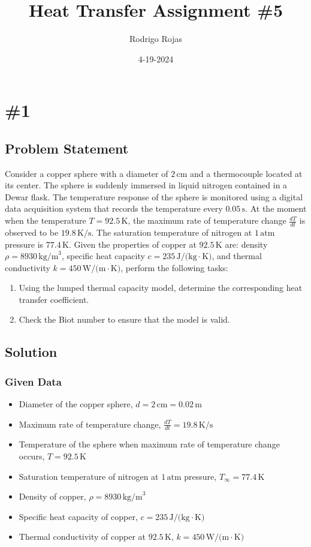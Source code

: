 \documentclass{article}
\title{Heat Transfer Assignment \#5}
\author{Rodrigo Rojas}
\date{4-19-2024}
\numberwithin{equation}{section}
\begin{document}
\maketitle

\section{\#1}
\subsection*{Problem Statement}

Consider a copper sphere with a diameter of $2 \, \text{cm}$ and a thermocouple located at its center. The sphere is suddenly immersed in liquid nitrogen contained in a Dewar flask. The temperature response of the sphere is monitored using a digital data acquisition system that records the temperature every $0.05 \, \text{s}$. At the moment when the temperature $T = 92.5 \, \text{K}$, the maximum rate of temperature change $\frac{dT}{dt}$ is observed to be $19.8 \, \text{K/s}$. The saturation temperature of nitrogen at $1 \, \text{atm}$ pressure is $77.4 \, \text{K}$. Given the properties of copper at $92.5 \, \text{K}$ are: density $\rho = 8930 \, \text{kg/m}^3$, specific heat capacity $c = 235 \, \text{J/(kg}\cdot\text{K)}$, and thermal conductivity $k = 450 \, \text{W/(m}\cdot\text{K)}$, perform the following tasks:

\begin{enumerate}
  \item Using the lumped thermal capacity model, determine the corresponding heat transfer coefficient.
  \item Check the Biot number to ensure that the model is valid.
\end{enumerate}

\subsection*{Solution}

\subsubsection*{Given Data}
\begin{itemize}
    \item Diameter of the copper sphere, $d = 2 \, \text{cm} = 0.02 \, \text{m}$
    \item Maximum rate of temperature change, $\frac{dT}{dt} = 19.8 \, \text{K/s}$
    \item Temperature of the sphere when maximum rate of temperature change occurs, $T = 92.5 \, \text{K}$
    \item Saturation temperature of nitrogen at $1 \, \text{atm}$ pressure, $T_{\infty} = 77.4 \, \text{K}$
    \item Density of copper, $\rho = 8930 \, \text{kg/m}^3$
    \item Specific heat capacity of copper, $c = 235 \, \text{J/(kg} \cdot \text{K)}$
    \item Thermal conductivity of copper at $92.5 \, \text{K}$, $k = 450 \, \text{W/(m} \cdot \text{K)}$
\end{itemize}
\end{document}
